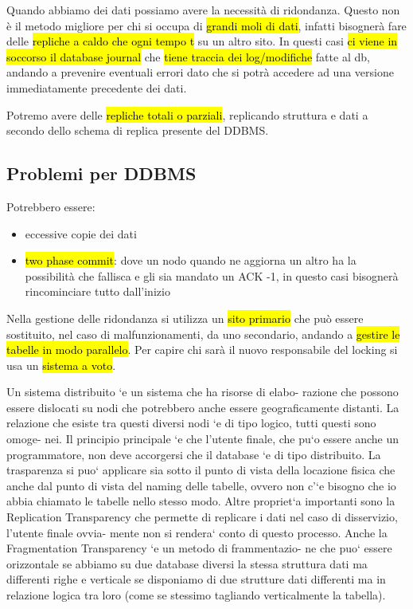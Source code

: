 Quando abbiamo dei dati possiamo avere la necessità di ridondanza. Questo non è il metodo migliore per chi si occupa di \hl{grandi moli di dati}, infatti bisognerà fare delle \hl{repliche a caldo che ogni tempo t} su un altro sito. In questi casi \hl{ci viene in soccorso il database journal} che \hl{tiene traccia dei log/modifiche} fatte al db, andando a prevenire eventuali errori dato che si potrà accedere ad una versione immediatamente precedente dei dati.

Potremo avere delle \hl{repliche totali o parziali}, replicando struttura e dati a secondo dello schema di replica presente del DDBMS.


\subsection{Problemi per DDBMS}

Potrebbero essere:

\begin{itemize}
    \item eccessive copie dei dati
    \item \hl{two phase commit}: dove un nodo quando ne aggiorna un altro ha la possibilità che fallisca e gli sia mandato un ACK -1, in questo casi bisognerà rincominciare tutto dall'inizio
\end{itemize}

Nella gestione delle ridondanza si utilizza un \hl{sito primario} che può essere sostituito, nel caso di malfunzionamenti, da uno secondario, andando a \hl{gestire le tabelle in modo parallelo}. Per capire chi sarà il nuovo responsabile del locking si usa un \hl{sistema a voto}. 







Un sistema distribuito `e un sistema che ha risorse di elabo- razione che possono essere dislocati su nodi che potrebbero anche essere geograficamente distanti. La relazione che esiste tra questi diversi nodi `e di tipo logico, tutti questi sono omoge- nei. Il principio principale `e che l’utente finale, che pu`o essere anche un programmatore, non deve accorgersi che il database `e di tipo distribuito. La trasparenza si puo` applicare sia sotto il punto di vista della locazione fisica che anche dal punto di vista del naming delle tabelle, ovvero non c’`e bisogno che io abbia chiamato le tabelle nello stesso modo. Altre propriet`a importanti sono la Replication Transparency che permette di replicare i dati nel caso di disservizio, l’utente finale ovvia- mente non si rendera` conto di questo processo. Anche la Fragmentation Transparency `e un metodo di frammentazio- ne che puo` essere orizzontale se abbiamo su due database diversi la stessa struttura dati ma differenti righe e verticale se disponiamo di due strutture dati differenti ma in relazione logica tra loro (come se stessimo tagliando verticalmente la tabella).


